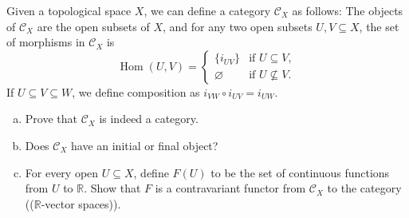 \documentclass[10pt]{article}
\providecommand{\RR}{\mathbb R}
\providecommand{\ii}{\item}
\providecommand{\Hom}{\operatorname{Hom}}
\newcommand{\doubleparen}[1]{(\!(#1)\!)}
\begin{document}
\begin{problem}
    Given a topological space $X$, we can define
    a category $\mathscr C_X$ as follows:
    The objects of $\mathscr C_X$ are the open subsets of $X$,
    and for any two open subsets $U,V\subseteq X$,
    the set of morphisms in $\mathscr C_X$ is
    \begin{equation*}
        \Hom(U,V) = \begin{cases}
	    \{i_{UV}\} & \text{if }U\subseteq V,\\
	    \varnothing & \text{if }U\not\subseteq V.
        \end{cases}
    \end{equation*}
    If $U\subseteq V\subseteq W$, we define composition as
    $i_{VW}\circ i_{UV} = i_{UW}$.
    \begin{enumerate}[(a)]
        \ii Prove that $\mathscr C_X$ is indeed a category.
	\ii Does $\mathscr C_X$ have an initial or final object?
	\ii For every open $U\subseteq X$, define $F(U)$ to be
	the set of continuous functions from $U$ to $\RR$.
	Show that $F$ is a contravariant functor from $\mathscr C_X$
	to the category \doubleparen{$\RR$-vector spaces}.
    \end{enumerate}
\end{problem}
\end{document}
